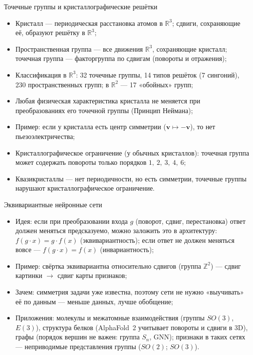 \documentclass[serif, aspectratio=169]{beamer}
\begin{document}
\begin{frame}{Точечные группы и кристаллографические решётки}
    \begin{itemize}
        \item Кристалл --- периодическая расстановка атомов в $\mathbb{R}^3$; сдвиги, сохраняющие её, образуют решётку в $\mathbb{R}^3$;
        \item Пространственная группа --- все движения $\mathbb{R}^3$, сохраняющие кристалл; точечная группа --- факторгруппа по сдвигам (повороты и отражения);
        \item Классификация в $\mathbb{R}^3$: 32 точечные группы, 14 типов решёток (7 сингоний), 230 пространственных групп; в $\mathbb{R}^2$ --- 17 «обойных» групп;
        \item Любая физическая характеристика кристалла не меняется при преобразованиях его точечной группы (Принцип Неймана);
        \item Пример: если у кристалла есть центр симметрии ($\mathbf{v}\mapsto-\mathbf{v}$), то нет пьезоэлектричества;
        \item Кристаллографическое ограничение (у обычных кристаллов): точечная группа может содержать повороты только порядков $1,\ 2,\ 3,\ 4,\ 6$;
        \item Квазикристаллы --- нет периодичности, но есть симметрии, точечные группы нарушают кристаллографическое ограничение.
    \end{itemize}
    \note{
        \begin{itemize}
            \item ---
        \end{itemize}
    }
\end{frame}

\begin{frame}{Эквивариантные нейронные сети}
    \begin{itemize}
        \item Идея: если при преобразовании входа $g$ (поворот, сдвиг, перестановка) ответ должен меняться предсказуемо, можно заложить это в архитектуру: $f(g\cdot x)=g\cdot f(x)$ (эквивариантность); если ответ не должен меняться вовсе --- $f(g\cdot x)=f(x)$ (инвариантность);
        \item Пример: свёртка эквивариантна относительно сдвигов (группа $\mathbb{Z}^2$) --- сдвиг картинки $\to$ сдвиг карты признаков;
        \item Зачем: симметрия задачи уже известна, поэтому сети не нужно «выучивать» её по данным --- меньше данных, лучше обобщение;
        \item Приложения: молекулы и межатомные взаимодействия (группы $SO(3)$, $E(3)$), структура белков (AlphaFold~2 учитывает повороты и сдвиги в 3D), графы (порядок вершин не важен: группа $S_n$, GNN); признаки в таких сетях --- неприводимые представления группы ($SO(2)$; $SO(3)$).
    \end{itemize}
    \note{
        \begin{itemize}
            \item ---
        \end{itemize}
    }
\end{frame}
\end{document}
